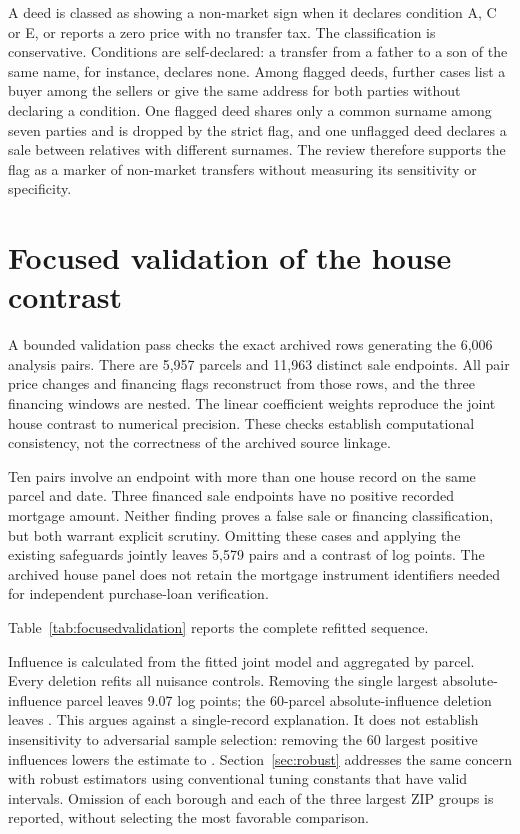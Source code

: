 \documentclass[12pt]{article}
\begin{document}
A deed is classed as showing a non-market sign when it declares condition A, C or E, or reports a zero price with no transfer tax. The classification is conservative. Conditions are self-declared: a transfer from a father to a son of the same name, for instance, declares none. Among flagged deeds, \DeedPossible{} further cases list a buyer among the sellers or give the same address for both parties without declaring a condition. One flagged deed shares only a common surname among seven parties and is dropped by the strict flag, and one unflagged deed declares a sale between relatives with different surnames. The review therefore supports the flag as a marker of non-market transfers without measuring its sensitivity or specificity.

\section{Focused validation of the house contrast}\label{sec:focusedvalidation}
A bounded validation pass checks the exact archived rows generating the 6,006 analysis pairs. There are 5,957 parcels and 11,963 distinct sale endpoints. All pair price changes and financing flags reconstruct from those rows, and the three financing windows are nested. The linear coefficient weights reproduce the joint house contrast to numerical precision. These checks establish computational consistency, not the correctness of the archived source linkage.

Ten pairs involve an endpoint with more than one house record on the same parcel and date. Three financed sale endpoints have no positive recorded mortgage amount. Neither finding proves a false sale or financing classification, but both warrant explicit scrutiny. Omitting these cases and applying the existing safeguards jointly leaves 5,579 pairs and a contrast of \FocusedJoint{} log points. The archived house panel does not retain the mortgage instrument identifiers needed for independent purchase-loan verification.

Table~\ref{tab:focusedvalidation} reports the complete refitted sequence.


Influence is calculated from the fitted joint model and aggregated by parcel. Every deletion refits all nuisance controls. Removing the single largest absolute-influence parcel leaves 9.07 log points; the 60-parcel absolute-influence deletion leaves \FocusedTopSixty{}. This argues against a single-record explanation. It does not establish insensitivity to adversarial sample selection: removing the 60 largest positive influences lowers the estimate to \FocusedPositive{}. Section~\ref{sec:robust} addresses the same concern with robust estimators using conventional tuning constants that have valid intervals. Omission of each borough and each of the three largest ZIP groups is reported, without selecting the most favorable comparison.
\end{document}
